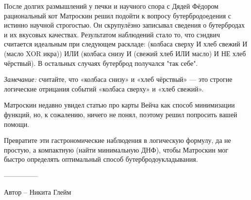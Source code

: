 \question
После долгих размышлений у печки и научного спора с Дядей Фёдором рациональный кот Матроскин решил подойти к вопросу бутербродоедения с истинно научной строгостью. Он скрупулёзно записывал сведения о бутербродах и их вкусовых качествах. Результатом наблюдений стало то,
что сэндвич считается идеальным при следующем раскладе: (колбаса сверху И хлеб свежий И (масло XOR икра)) ИЛИ (колбаса снизу И (свежий хлеб ИЛИ масло) И НЕ хлеб чёрствый). В остальных случаях бутерброд получался "так себе". 

\textit{Замечание:} считайте, что «колбаса снизу» и «хлеб чёрствый» --- это строгие логические отрицания событий «колбаса сверху» и «хлеб свежий».

Матроскин недавно увидел статью про карты Вейча как способ минимизации функций, но, к сожалению, ничего не понял, поэтому решил попросить вашей помощи.

Превратите эти гастрономические наблюдения в логическую формулу, да не простую, а компактную (найти минимальную ДНФ), чтобы Матроскин мог быстро определять оптимальный способ бутербродоукладывания.

---------------

Автор -- Никита Глейм